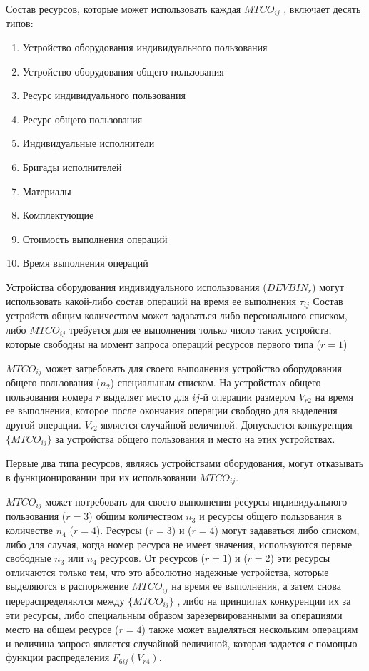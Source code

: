 Состав ресурсов, которые может использовать каждая $MTCO_{ij}$ , включает десять типов:
\begin{enumerate}
    \item Устройство оборудования индивидуального пользования
    \item Устройство оборудования общего пользования
    \item Ресурс индивидуального пользования
    \item Ресурс общего пользования
    \item Индивидуальные исполнители
    \item Бригады исполнителей
    \item Материалы
    \item Комплектующие
    \item Стоимость выполнения операций
    \item Время  выполнения операций
\end{enumerate}

Устройства оборудования индивидуального использования ($DEVBIN_r$) могут использовать какой-либо состав операций  на время ее выполнения  $\tau_{ij}$ Состав устройств общим количеством   может задаваться либо  персонального списком, либо  $MTCO_{ij}$ требуется для ее выполнения только число таких устройств, которые свободны на момент запроса операций ресурсов первого типа ($r=1$)

$MTCO_{ij}$ может затребовать для своего выполнения устройство оборудования общего пользования ($n_2$) специальным списком. На устройствах общего пользования номера $r$ выделяет место для  $ij$-й операции размером $V_{r2}$ на время ее выполнения, которое после окончания операции свободно для выделения другой операции. $V_{r2}$ является случайной величиной. Допускается конкуренция  $\big\{MTCO_{ij}\big\}$ за устройства общего пользования и место на этих устройствах.

Первые два типа ресурсов, являясь устройствами оборудования, могут отказывать в функционировании при их использовании $MTCO_{ij}$.

$MTCO_{ij}$ может потребовать для своего выполнения ресурсы индивидуального пользования ($r=3$) общим количеством $n_3$ и ресурсы общего пользования  в количестве $n_4$ ($r=4$). Ресурсы ($r=3$) и  ($r=4$) могут задаваться либо списком, либо для случая, когда номер ресурса не имеет значения, используются первые свободные $n_3$ или $n_4$ ресурсов.
От ресурсов ($r=1$) и ($r=2$) эти ресурсы отличаются только тем, что это абсолютно надежные устройства, которые выделяются в распоряжение $MTCO_{ij}$ на время ее выполнения, а затем снова перераспределяются между $\big\{MTCO_{ij}\big\}$ , либо на принципах конкуренции их за эти ресурсы, либо специальным образом зарезервированными за операциями место на общем ресурсе ($r=4$) также может выделяться нескольким операциям  и величина запроса является случайной величиной, которая задается с помощью функции распределения $F_{6ij}(V_{r4})$.


